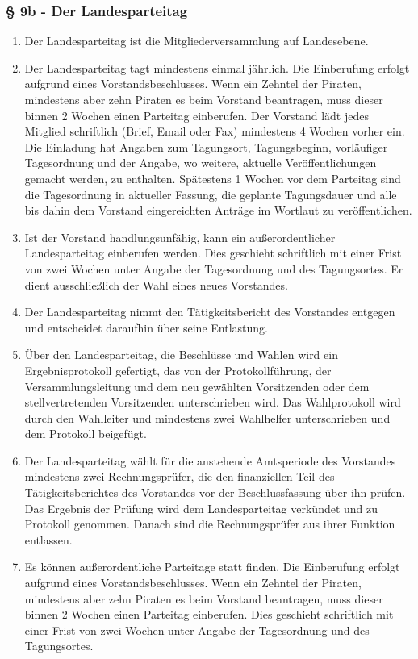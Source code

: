 \subsubsection{§ 9b - Der Landesparteitag}
\begin{enumerate}
\item Der Landesparteitag ist die Mitgliederversammlung auf Landesebene.

\item Der Landesparteitag tagt mindestens einmal jährlich. Die Einberufung
erfolgt aufgrund eines Vorstandsbeschlusses. Wenn ein Zehntel der Piraten,
mindestens aber zehn Piraten es beim Vorstand beantragen, muss dieser binnen 2
Wochen einen Parteitag einberufen. Der Vorstand lädt jedes Mitglied schriftlich
(Brief, Email oder Fax) mindestens 4 Wochen vorher ein. Die Einladung hat
Angaben zum Tagungsort, Tagungsbeginn, vorläufiger Tagesordnung und der Angabe,
wo weitere, aktuelle Veröffentlichungen gemacht werden, zu enthalten. Spätestens
1 Wochen vor dem Parteitag sind die Tagesordnung in aktueller Fassung, die
geplante Tagungsdauer und alle bis dahin dem Vorstand eingereichten Anträge im
Wortlaut zu veröffentlichen.

\item Ist der Vorstand handlungsunfähig, kann ein außerordentlicher
Landesparteitag einberufen werden. Dies geschieht schriftlich mit einer Frist
von zwei Wochen unter Angabe der Tagesordnung und des Tagungsortes. Er dient
ausschließlich der Wahl eines neues Vorstandes.

\item Der Landesparteitag nimmt den Tätigkeitsbericht des Vorstandes entgegen
und entscheidet daraufhin über seine Entlastung.

\item Über den Landesparteitag, die Beschlüsse und Wahlen wird ein
Ergebnisprotokoll gefertigt, das von der Protokollführung, der
Versammlungsleitung und dem neu gewählten Vorsitzenden oder dem
stellvertretenden Vorsitzenden unterschrieben wird. Das Wahlprotokoll wird durch
den Wahlleiter und mindestens zwei Wahlhelfer unterschrieben und dem Protokoll
beigefügt.

\item Der Landesparteitag wählt für die anstehende Amtsperiode des Vorstandes
mindestens zwei Rechnungsprüfer, die den finanziellen Teil des
Tätigkeitsberichtes des Vorstandes vor der Beschlussfassung über ihn prüfen. Das
Ergebnis der Prüfung wird dem Landesparteitag verkündet und zu Protokoll
genommen. Danach sind die Rechnungsprüfer aus ihrer Funktion entlassen.

\item Es können außerordentliche Parteitage statt finden. Die Einberufung
erfolgt aufgrund eines Vorstandsbeschlusses. Wenn ein Zehntel der Piraten,
mindestens aber zehn Piraten es beim Vorstand beantragen, muss dieser binnen 2
Wochen einen Parteitag einberufen. Dies geschieht schriftlich mit einer Frist
von zwei Wochen unter Angabe der Tagesordnung und des Tagungsortes.
\end{enumerate}

